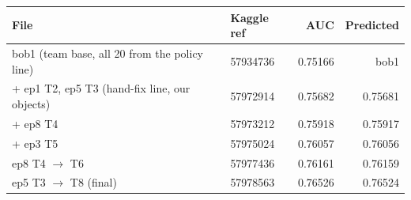 \begin{tabular}{@{}llrr@{}}
\toprule
File & Kaggle ref & AUC & Predicted \\
\midrule
bob1 (team base, all 20 from the policy line) & 57934736 & 0.75166 & bob1 \\
+ ep1 T2, ep5 T3 (hand-fix line, our objects) & 57972914 & 0.75682 & 0.75681 \\
+ ep8 T4 & 57973212 & 0.75918 & 0.75917 \\
+ ep3 T5 & 57975024 & 0.76057 & 0.76056 \\
ep8 T4 $\to$ T6 & 57977436 & 0.76161 & 0.76159 \\
ep5 T3 $\to$ T8 (final) & 57978563 & 0.76526 & 0.76524 \\
\bottomrule
\end{tabular}
